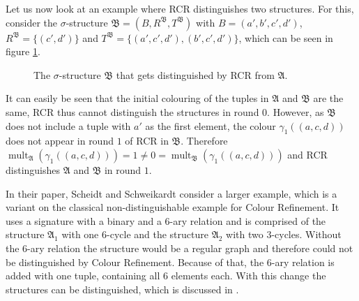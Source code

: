 Let us now look at an example where RCR distinguishes two structures.
For this, consider the $\sigma$-structure $\mathfrak B=(B, R^{\mathfrak B}, T^{\mathfrak B})$ with $B=(a',b',c',d')$, $R^{\mathfrak B}=\{(c',d')\}$ and $T^{\mathfrak B}=\{(a',c',d'),(b',c',d')\}$, which can be seen in figure \ref{fig:distinguishedByRCR}.
\begin{figure}
	\centering
	\caption{The $\sigma$-structure $\mathfrak B$ that gets distinguished by RCR from $\mathfrak A$.}
	\label{fig:distinguishedByRCR}
\end{figure}
It can easily be seen that the initial colouring of the tuples in $\mathfrak A$ and $\mathfrak B$ are the same, RCR thus cannot distinguish the structures in round $0$.
However, as $\mathfrak B$ does not include a tuple with $a'$ as the first element, the colour $\gamma_1((a,c,d))$ does not appear in round $1$ of RCR in $\mathfrak B$.
Therefore $\operatorname{mult}_{\mathfrak A}(\gamma_1((a,c,d)))=1\neq 0 = \operatorname{mult}_{\mathfrak B}(\gamma_1((a,c,d)))$ and RCR distinguishes $\mathfrak A$ and $\mathfrak B$ in round $1$.

In their paper, Scheidt and Schweikardt consider a larger example, which is a variant on the classical non-distinguishable example for Colour Refinement.
It uses a signature with a binary and a $6$-ary relation and is comprised of the structure $\mathfrak A_1$ with one $6$-cycle and the structure $\mathfrak A_2$ with two $3$-cycles.
Without the $6$-ary relation the structure would be a regular graph and therefore could not be distinguished by Colour Refinement.
Because of that, the $6$-ary relation is added with one tuple, containing all $6$ elements each.
With this change the structures can be distinguished, which is discussed in \cite{scheidt2025ColorRefinement}.

